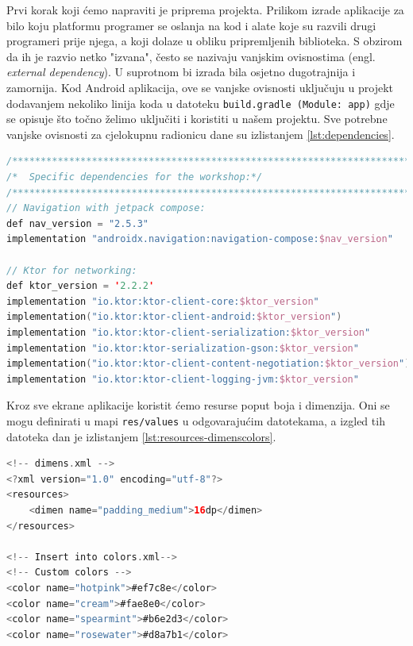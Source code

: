 \documentclass[11pt,a4paper,twoside]{article}
\begin{document}
Prvi korak koji ćemo napraviti je priprema projekta. Prilikom izrade aplikacije za bilo koju platformu programer se oslanja na kod i alate koje su razvili drugi programeri prije njega, a koji dolaze u obliku pripremljenih biblioteka. S obzirom da ih je razvio netko "izvana", često se nazivaju vanjskim ovisnostima (engl. \textit{external dependency}). U suprotnom bi izrada bila osjetno dugotrajnija i zamornija. Kod Android aplikacija, ove se vanjske ovisnosti uključuju u projekt dodavanjem nekoliko linija koda u datoteku \texttt{build.gradle (Module: app)} gdje se opisuje što točno želimo uključiti i koristiti u našem projektu. Sve potrebne vanjske ovisnosti za cjelokupnu radionicu dane su izlistanjem \ref{lst:dependencies}.

\begin{lstlisting}[caption={Ovisnosnosti o vanjskim bibliotekama u datoteci build.gradle (Module:app)}, label={lst:dependencies}, language=Kotlin]
/***********************************************************************/
/*  Specific dependencies for the workshop:*/
/***********************************************************************/
// Navigation with jetpack compose:
def nav_version = "2.5.3"
implementation "androidx.navigation:navigation-compose:$nav_version"

// Ktor for networking:
def ktor_version = '2.2.2'
implementation "io.ktor:ktor-client-core:$ktor_version"
implementation("io.ktor:ktor-client-android:$ktor_version")
implementation "io.ktor:ktor-client-serialization:$ktor_version"
implementation "io.ktor:ktor-serialization-gson:$ktor_version"
implementation("io.ktor:ktor-client-content-negotiation:$ktor_version")
implementation "io.ktor:ktor-client-logging-jvm:$ktor_version"
\end{lstlisting}

Kroz sve ekrane aplikacije koristit ćemo resurse poput boja i dimenzija. Oni se mogu definirati u mapi \texttt{res/values} u odgovarajućim datotekama, a izgled tih datoteka dan je izlistanjem \ref{lst:resources-dimenscolors}.

\begin{lstlisting}[caption={Dimenzije i boje - dimens.xml i colors.xml}, label={lst:resources-dimenscolors}, language=Kotlin]
<!-- dimens.xml -->
<?xml version="1.0" encoding="utf-8"?>
<resources>
	<dimen name="padding_medium">16dp</dimen>
</resources>

<!-- Insert into colors.xml-->
<!-- Custom colors -->
<color name="hotpink">#ef7c8e</color>
<color name="cream">#fae8e0</color>
<color name="spearmint">#b6e2d3</color>
<color name="rosewater">#d8a7b1</color>
\end{lstlisting}
\end{document}

